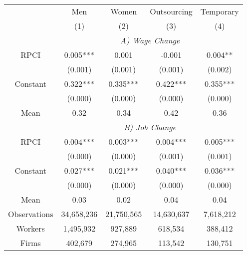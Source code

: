 \begin{tabular}{ccccc}
\toprule
\toprule
      & Men   & Women & Outsourcing & Temporary \\
      & (1)   & (2)   & (3)   & (4) \\
\cmidrule{2-5}      & \multicolumn{4}{c}{\textit{A) Wage Change}} \\
\midrule
RPCI  & 0.005*** & 0.001 & -0.001 & 0.004** \\
      & (0.001) & (0.001) & (0.001) & (0.002) \\
Constant & 0.322*** & 0.335*** & 0.422*** & 0.355*** \\
      & (0.000) & (0.000) & (0.000) & (0.000) \\
Mean  & 0.32  & 0.34  & 0.42  & 0.36 \\
\cmidrule{2-5}      & \multicolumn{4}{c}{\textit{B) Job Change}} \\
\midrule
RPCI  & 0.004*** & 0.003*** & 0.004*** & 0.005*** \\
      & (0.000) & (0.000) & (0.001) & (0.001) \\
Constant & 0.027*** & 0.021*** & 0.040*** & 0.036*** \\
      & (0.000) & (0.000) & (0.000) & (0.000) \\
Mean  & 0.03  & 0.02  & 0.04  & 0.04 \\
\midrule
Observations & 34,658,236 & 21,750,565 & 14,630,637 & 7,618,212 \\
Workers & 1,495,932 & 927,889 & 618,534 & 388,412 \\
Firms & 402,679 & 274,965 & 113,542 & 130,751 \\
\bottomrule
\bottomrule
\end{tabular}%
